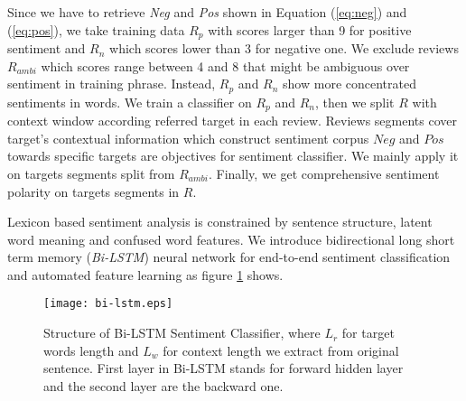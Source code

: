 \par Since we have to retrieve \emph{Neg} and \emph{Pos} shown in Equation (\ref{eq:neg}) and (\ref{eq:pos}), we take training data $R_p$ with scores larger than 9 for positive sentiment and $R_n$ which scores lower than 3 for negative one. We exclude reviews $R_{ambi}$ which scores range between 4 and 8 that might be ambiguous over sentiment in training phrase. Instead, $R_p$ and $R_n$ show more concentrated sentiments in words. We train a classifier on $R_p$ and $R_n$, then we split $R$ with context window according referred target in each review. Reviews segments cover target's contextual information which construct sentiment corpus $Neg$ and $Pos$ towards specific targets are objectives for sentiment classifier. We mainly apply it on targets segments split from $R_{ambi}$. Finally, we get comprehensive sentiment polarity on targets segments in $R$.

\par Lexicon based sentiment analysis is constrained by sentence structure, latent word meaning and confused word features. We introduce bidirectional long short term memory (\emph{Bi-LSTM}) neural network for end-to-end sentiment classification and automated feature learning as figure \ref{fig:lstm} shows.

\begin{figure}[!htbp]
\centering
\texttt{[image: bi-lstm.eps]}
\caption{Structure of Bi-LSTM Sentiment Classifier, where $L_r$ for target words length and $L_w$ for context length we extract from original sentence. First layer in Bi-LSTM stands for forward hidden layer and the second layer are the backward one.}
\label{fig:lstm}
\end{figure}

